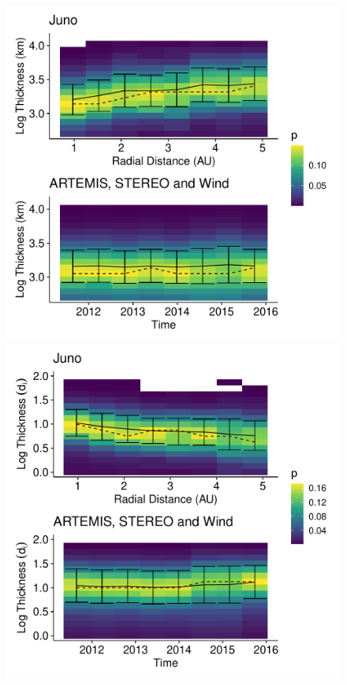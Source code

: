 \documentclass[
]{agujournal2019}
\begin{document}
\begin{figure}

\begin{minipage}{0.33\linewidth}
\includegraphics{figures/thickness/thickness_k_dist.pdf}\end{minipage}%
%
\begin{minipage}{0.33\linewidth}
\includegraphics{figures/thickness/thickness_k_N1_dist.pdf}\end{minipage}%

\end{figure}
\end{document}
